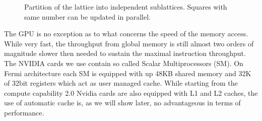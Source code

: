 \documentclass[a4paper]{llncs}
\def\bksize{8}
\begin{document}
\begin{figure}
\begin{center} 
\end{center}
\caption{\label{fig:part}Partition of the lattice into independent
  sublattices. Squares with same number can be updated in parallel.}
\end{figure}



The GPU is no exception as to what concerns the speed of the memory
access.  While very fast, the throughput from global memory is still
almost two orders of magnitude slower then needed to sustain the
maximal instruction throughput.  The NVIDIA cards we use contain so
called { Scalar Multiprocessors} (SM). On Fermi architecture each SM
is equipped with up 48KB shared memory and 32K of 32bit
registers\cite{Fermi} which act as user managed cache. While starting
from the compute capability 2.0 Nvidia cards are also equipped with L1
and L2 caches, the use of automatic cache is, as we will show later,
no advantageous in terms of performance.
\end{document}
